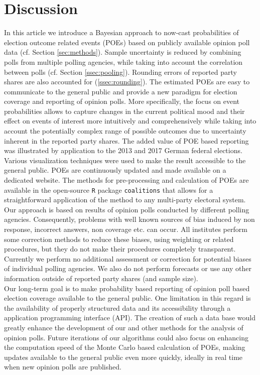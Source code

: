\documentclass[smallcondensed]{svjour3}     %
\begin{document}
\section{Discussion} \label{sec:conclusion}
In this article we introduce a Bayesian approach to now-cast probabilities of
election outcome related events (POEs) based on publicly available opinion poll data
(cf. Section \ref{sec:methods}).
Sample uncertainty is reduced by combining polls from multiple polling agencies,
while taking into account the correlation between polls
(cf. Section \ref{ssec:pooling}). Rounding errors of
reported party shares are also accounted for (\ref{ssec:rounding}).
The estimated POEs are easy to communicate to the general public and provide
a new paradigm for election coverage and reporting of opinion polls.
More specifically, the focus on event probabilities allows to capture
changes in the current political mood and their effect on events of interest more
intuitively and comprehensively while taking into account the potentially complex
range of possible outcomes due to uncertainty inherent in the
reported party shares. The added value of POE based reporting was illustrated by
application to the 2013 and 2017 German federal elections.
Various visualization techniques were used to make the result accessible to the
general public. POEs are continuously updated and
made available on a dedicated website. The methods for pre-processing and
calculation of POEs are available in the
open-source \texttt{R} package \texttt{coalitions} that allows for a straightforward
application of the method to any multi-party electoral system.\\

Our approach is based on results of opinion polls conducted by different
polling agencies. Consequently, problems with well known sources of bias induced
by non response, incorrect answers, non coverage etc. can occur. All institutes
perform some correction methods to reduce these biases, using weighting or related
procedures, but they do not make their procedures completely transparent.
Currently we perform no additional assessment or correction for potential biases
of individual polling agencies. We also do not perform forecasts or use
any other information outside of reported party shares (and sample size).\\


Our long-term goal is to make probability based reporting of opinion poll based
election coverage available to the general public. One limitation in this regard
is the availability of properly structured data and its accessibility through
a application programming interface (API). The creation of such a data base
would greatly enhance the development of our and other methods for the analysis
of opinion polls. Future iterations of our algorithms could also focus on
enhancing  the computation speed of the Monte Carlo based calculation of
POEs, making updates available to the general public even more quickly,
ideally in real time when new opinion polls are published.
\end{document}
